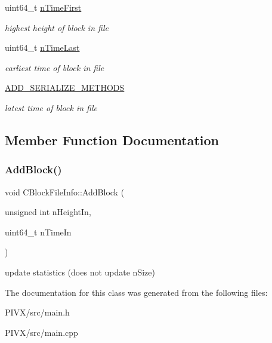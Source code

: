 \begin{DoxyCompactItemize}
uint64\+\_\+t \mbox{\hyperlink{class_c_block_file_info_a0e928257d1f003ede485ce49e8cf9189}{n\+Time\+First}}
\begin{DoxyCompactList}\small\item\em highest height of block in file \end{DoxyCompactList}\item 
\mbox{\label{class_c_block_file_info_a1d12e4202474bb2f299d18d7d1f28c78}} 
uint64\+\_\+t \mbox{\hyperlink{class_c_block_file_info_a1d12e4202474bb2f299d18d7d1f28c78}{n\+Time\+Last}}
\begin{DoxyCompactList}\small\item\em earliest time of block in file \end{DoxyCompactList}\item 
\mbox{\label{class_c_block_file_info_ab4daf4df00f90dee15e3a7d2cdb7a273}} 
\mbox{\hyperlink{class_c_block_file_info_ab4daf4df00f90dee15e3a7d2cdb7a273}{A\+D\+D\+\_\+\+S\+E\+R\+I\+A\+L\+I\+Z\+E\+\_\+\+M\+E\+T\+H\+O\+DS}}
\begin{DoxyCompactList}\small\item\em latest time of block in file \end{DoxyCompactList}\end{DoxyCompactItemize}


\subsection{Member Function Documentation}
\mbox{\label{class_c_block_file_info_a66867569ffe06068b8c6eb1139934fbf}} 
\subsubsection{\texorpdfstring{Add\+Block()}{AddBlock()}}
{\footnotesize\ttfamily void C\+Block\+File\+Info\+::\+Add\+Block (\begin{DoxyParamCaption}\item[{unsigned int}]{n\+Height\+In,  }\item[{uint64\+\_\+t}]{n\+Time\+In }\end{DoxyParamCaption})\hspace{0.3cm}{\ttfamily [inline]}}

update statistics (does not update n\+Size) 

The documentation for this class was generated from the following files\+:\begin{DoxyCompactItemize}
\item 
P\+I\+V\+X/src/main.\+h\item 
P\+I\+V\+X/src/main.\+cpp\end{DoxyCompactItemize}
